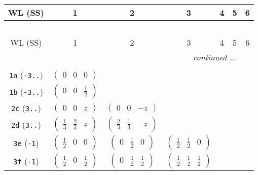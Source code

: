 \documentclass[fleqn,9pt,landscape]{jsarticle}
\begin{document}
\begin{center}
\renewcommand{\arraystretch}{1.2}
\begin{longtable}{ccccccc}
 \hline \hline
WL (SS) & 1 & 2 & 3 & 4 & 5 & 6 \\ \hline \endfirsthead

\multicolumn{6}{l}{\tablename\ \thetable{}} \\
 \hline \hline
WL (SS) & 1 & 2 & 3 & 4 & 5 & 6 \\ \hline \endhead

 \hline \hline
\multicolumn{6}{r}{\footnotesize\it continued ...} \\ \endfoot

 \hline \hline
\multicolumn{6}{r}{} \\ \endlastfoot

{\tt 1a} ({\tt -3..}) & $ \begin{pmatrix} 0 & 0 & 0 \end{pmatrix} $ & $  $ & $  $ & $  $ & $  $ & $  $ \\ \hline
{\tt 1b} ({\tt -3..}) & $ \begin{pmatrix} 0 & 0 & \frac{1}{2} \end{pmatrix} $ & $  $ & $  $ & $  $ & $  $ & $  $ \\ \hline
{\tt 2c} ({\tt 3..}) & $ \begin{pmatrix} 0 & 0 & z \end{pmatrix} $ & $ \begin{pmatrix} 0 & 0 & - z \end{pmatrix} $ & $  $ & $  $ & $  $ & $  $ \\ \hline
{\tt 2d} ({\tt 3..}) & $ \begin{pmatrix} \frac{1}{3} & \frac{2}{3} & z \end{pmatrix} $ & $ \begin{pmatrix} \frac{2}{3} & \frac{1}{3} & - z \end{pmatrix} $ & $  $ & $  $ & $  $ & $  $ \\ \hline
{\tt 3e} ({\tt -1}) & $ \begin{pmatrix} \frac{1}{2} & 0 & 0 \end{pmatrix} $ & $ \begin{pmatrix} 0 & \frac{1}{2} & 0 \end{pmatrix} $ & $ \begin{pmatrix} \frac{1}{2} & \frac{1}{2} & 0 \end{pmatrix} $ & $  $ & $  $ & $  $ \\ \hline
{\tt 3f} ({\tt -1}) & $ \begin{pmatrix} \frac{1}{2} & 0 & \frac{1}{2} \end{pmatrix} $ & $ \begin{pmatrix} 0 & \frac{1}{2} & \frac{1}{2} \end{pmatrix} $ & $ \begin{pmatrix} \frac{1}{2} & \frac{1}{2} & \frac{1}{2} \end{pmatrix} $ & $  $ & $  $ & $  $ \\ \hline

\end{longtable}
\end{center}
\end{document}
